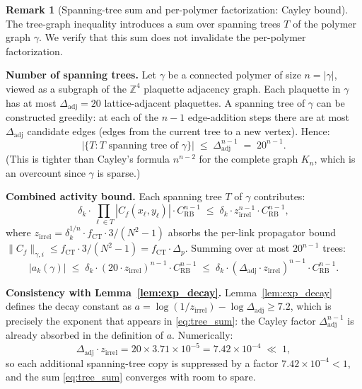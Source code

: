 \documentclass[11pt,a4paper]{amsart}
\theoremstyle{definition}
\newtheorem{remark}[theorem]{Remark}
\newcommand{\Z}{\mathbb{Z}}
\newcommand{\Cf}{C_f}
\newcommand{\CRB}{C_{\mathrm{RB}}}
\newcommand{\CT}{\mathrm{CT}}
\begin{document}
\begin{remark}[Spanning-tree sum and per-polymer factorization: Cayley bound]
\label{rem:cayley}
The tree-graph inequality introduces a sum over spanning trees $T$ of
the polymer graph $\gamma$.  We verify that this sum does not invalidate
the per-polymer factorization.

\textbf{Number of spanning trees.}
Let $\gamma$ be a connected polymer of size $n = |\gamma|$, viewed as a
subgraph of the $\Z^4$ plaquette adjacency graph.  Each plaquette in $\gamma$
has at most $\Delta_{\mathrm{adj}} = 20$ lattice-adjacent plaquettes.
A spanning tree of $\gamma$ can be constructed greedily: at each of the
$n-1$ edge-addition steps there are at most $\Delta_{\mathrm{adj}}$ candidate
edges (edges from the current tree to a new vertex).  Hence:
\begin{equation}
\label{eq:tree_count}
  |\{T : T \text{ spanning tree of } \gamma\}|
  \;\le\; \Delta_{\mathrm{adj}}^{n-1}
  \;=\; 20^{n-1}.
\end{equation}
(This is tighter than Cayley's formula $n^{n-2}$ for the complete graph
$K_n$, which is an overcount since $\gamma$ is sparse.)

\textbf{Combined activity bound.}
Each spanning tree $T$ of $\gamma$ contributes:
\[
  \delta_k \cdot \prod_{\ell\in T}|\Cf(x_\ell,y_\ell)| \cdot \CRB^{n-1}
  \;\le\; \delta_k \cdot z_{\mathrm{irrel}}^{n-1} \cdot \CRB^{n-1},
\]
where $z_{\mathrm{irrel}} = \delta_k^{1/n}\cdot f_{\CT} \cdot 3/(N^2-1)$
absorbs the per-link propagator bound
$\|\Cf\|_{\gamma,i} \le f_{\CT}\cdot 3/(N^2-1) = f_{\CT}\cdot \Delta_p$.
Summing over at most $20^{n-1}$ trees:
\begin{equation}
\label{eq:tree_sum}
  |a_k(\gamma)|
  \;\le\; \delta_k \cdot (20\cdot z_{\mathrm{irrel}})^{n-1} \cdot \CRB^{n-1}
  \;\le\; \delta_k \cdot (\Delta_{\mathrm{adj}}\cdot z_{\mathrm{irrel}})^{n-1} \cdot \CRB^{n-1}.
\end{equation}

\textbf{Consistency with Lemma~\ref{lem:exp_decay}.}
Lemma~\ref{lem:exp_decay} defines the decay constant as
$a = \log(1/z_{\mathrm{irrel}}) - \log\Delta_{\mathrm{adj}} \ge 7.2$, which
is precisely the exponent that appears in \eqref{eq:tree_sum}: the Cayley
factor $\Delta_{\mathrm{adj}}^{n-1}$ is already absorbed in the definition of $a$.
Numerically:
\[
  \Delta_{\mathrm{adj}} \cdot z_{\mathrm{irrel}}
  = 20 \times 3.71\times 10^{-5}
  = 7.42\times 10^{-4}
  \;\ll\; 1,
\]
so each additional spanning-tree copy is suppressed by a factor
$7.42\times 10^{-4} < 1$, and the sum \eqref{eq:tree_sum} converges
with room to spare.


\end{remark}
\end{document}
